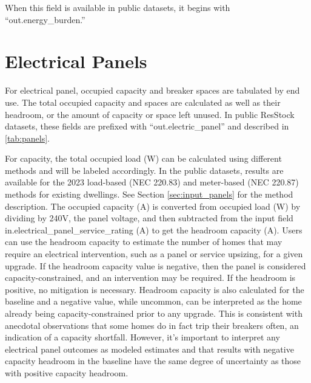 When this field is available in public datasets, it begins with ``out.energy\_burden.''

\section{Electrical Panels} \label{sec:output_panels}
For electrical panel, occupied capacity and breaker spaces are tabulated by end use. The total occupied capacity and spaces are calculated as well as their headroom, or the amount of capacity or space left unused.  In public ResStock datasets, these fields are prefixed with “out.electric_panel” and described in \ref{tab:panels}. 

For capacity, the total occupied load (W) can be calculated using different methods and will be labeled accordingly. In the public datasets, results are available for the 2023 load-based (NEC 220.83) and meter-based (NEC 220.87) methods for existing dwellings. See Section \ref{sec:input_panels} for the method description. The occupied capacity (A) is converted from occupied load (W) by dividing by 240V, the panel voltage, and then subtracted from the input field in.electrical_panel_service_rating (A) to get the headroom capacity (A). Users can use the headroom capacity to estimate the number of homes that may require an electrical intervention, such as a panel or service upsizing, for a given upgrade. If the headroom capacity value is negative, then the panel is considered capacity-constrained, and an intervention may be required. If the headroom is positive, no mitigation is necessary. Headroom capacity is also calculated for the baseline and a negative value, while uncommon, can be interpreted as the home already being capacity-constrained prior to any upgrade. This is consistent with anecdotal observations that some homes do in fact trip their breakers often, an indication of a capacity shortfall. However, it's important to interpret any electrical panel outcomes as modeled estimates and that results with negative capacity headroom in the baseline have the same degree of uncertainty as those with positive capacity headroom.  


